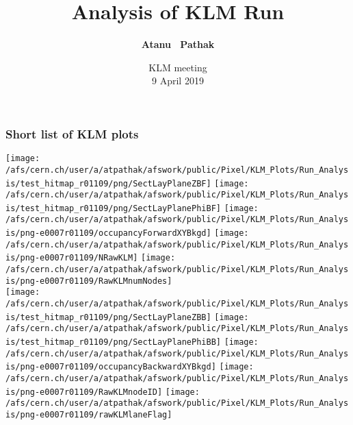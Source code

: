 \documentclass{beamer}
\title{Analysis of KLM Run} %
\author{{\bf Atanu ~Pathak} \\}
\institute{\begin{minipage}{0.5\textwidth}\centering
    \texttt{[image: /afs/cern.ch/user/s/swaban/public/university-of-louisville-logo.png]}
    \end{minipage}}
\date {{KLM meeting}\\9 April 2019}
\begin{document}
    \begin{frame}
    \titlepage
    \end{frame}
    \begin{frame}
    \frametitle{Short list of KLM plots}
    \vspace*{.05cm}
    \begin{center}
    \begin{normalsize}
    \vspace*{-.2cm}
    \begin{center}
    \texttt{[image: /afs/cern.ch/user/a/atpathak/afswork/public/Pixel/KLM\_Plots/Run\_Analysis/test\_hitmap\_r01109/png/SectLayPlaneZBF]}
    \texttt{[image: /afs/cern.ch/user/a/atpathak/afswork/public/Pixel/KLM\_Plots/Run\_Analysis/test\_hitmap\_r01109/png/SectLayPlanePhiBF]}
    \texttt{[image: /afs/cern.ch/user/a/atpathak/afswork/public/Pixel/KLM\_Plots/Run\_Analysis/png-e0007r01109/occupancyForwardXYBkgd]}
    \texttt{[image: /afs/cern.ch/user/a/atpathak/afswork/public/Pixel/KLM\_Plots/Run\_Analysis/png-e0007r01109/NRawKLM]}
    \texttt{[image: /afs/cern.ch/user/a/atpathak/afswork/public/Pixel/KLM\_Plots/Run\_Analysis/png-e0007r01109/RawKLMnumNodes]}\\
    \texttt{[image: /afs/cern.ch/user/a/atpathak/afswork/public/Pixel/KLM\_Plots/Run\_Analysis/test\_hitmap\_r01109/png/SectLayPlaneZBB]}
    \texttt{[image: /afs/cern.ch/user/a/atpathak/afswork/public/Pixel/KLM\_Plots/Run\_Analysis/test\_hitmap\_r01109/png/SectLayPlanePhiBB]}
    \texttt{[image: /afs/cern.ch/user/a/atpathak/afswork/public/Pixel/KLM\_Plots/Run\_Analysis/png-e0007r01109/occupancyBackwardXYBkgd]}
    \texttt{[image: /afs/cern.ch/user/a/atpathak/afswork/public/Pixel/KLM\_Plots/Run\_Analysis/png-e0007r01109/RawKLMnodeID]}
    \texttt{[image: /afs/cern.ch/user/a/atpathak/afswork/public/Pixel/KLM\_Plots/Run\_Analysis/png-e0007r01109/rawKLMlaneFlag]} \\
    
    \end{center}
    \end{normalsize}
    \end{center}
    \end{frame}
\end{document}
